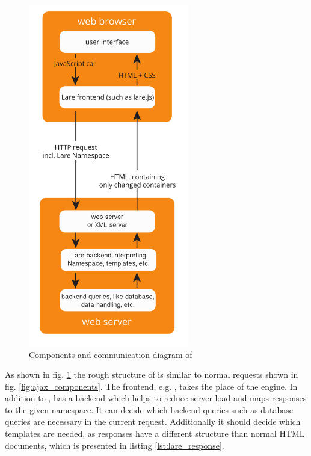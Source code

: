 \begin{figure}[H]
\centering
\includegraphics[height=15cm]{images/lare.pdf}
\caption[lare_components]{Components and communication diagram of \lare{}}
\label{fig:lare_components}
\end{figure}


\noindent{}As shown in fig. \ref{fig:lare_components} the rough structure of \lare{} is similar to normal \ajax{} requests shown in fig. \ref{fig:ajax_components}.
The \lare{} frontend, e.g. \lareJS{}, takes the place of the \ajax{} engine.
In addition to \ajax{}, \lare{} has a backend which helps to reduce server load and maps responses to the given namespace.
It can decide which backend queries such as database queries are necessary in the current request.
Additionally it should decide which templates are needed, as \lare{} responses have a different structure than normal HTML documents, which is presented in listing \ref{lst:lare_response}.

